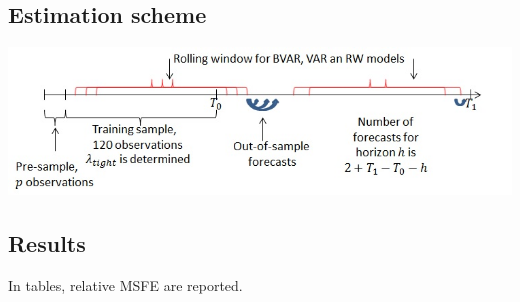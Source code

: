 \documentclass[a0, landscape]{a0poster}
\begin{document}
\begin{multicols}{3}
\subsection*{Estimation scheme}
\begin{center}
\includegraphics[scale=1.5]{estimation_scheme2}
\end{center}
%
%
%
%

%
\subsection*{Results}
In tables,  relative MSFE are reported.


\end{multicols}
\end{document}
